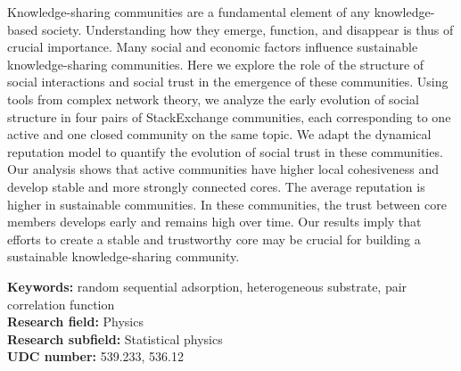 Knowledge-sharing communities are a fundamental element of any knowledge-based society. Understanding how they emerge, function, and disappear is thus of crucial importance. Many social and economic factors influence sustainable knowledge-sharing communities. Here we explore the role of the structure of social interactions and social trust in the emergence of these communities. Using tools from complex network theory, we analyze the early evolution of social structure in four pairs of StackExchange communities, each corresponding to one active and one closed community on the same topic. We adapt the dynamical reputation model to quantify the evolution of social trust in these communities. Our analysis shows that active communities have higher local cohesiveness and develop stable and more strongly connected cores. The average reputation is higher in sustainable communities. In these communities, the trust between core members develops early and remains high over time. Our results imply that efforts to create a stable and trustworthy core may be crucial for building a sustainable knowledge-sharing community.


\noindent
{\textbf {Keywords:}} random sequential adsorption, heterogeneous substrate, pair
correlation function\\
{\textbf {Research field:}} Physics \\
{\textbf {Research subfield:}} Statistical physics\\
\textbf{UDC number:} 539.233, 536.12

\hfill

\justify
